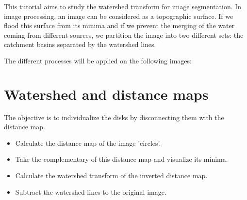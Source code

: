 \def\difficulty{3}

\begin{note}This tutorial aims to study the watershed transform for image segmentation. 
In image processing, an image can be considered as a topographic surface. If we flood this surface from its minima and if we prevent the merging of the water coming from different sources, we partition the image into two different sets: the catchment basins separated by the watershed lines. 
\end{note}

\noindent The different processes will be applied on the following images:

\begin{figure}[h]
\begin{center}
\hspace*{0.025cm}
\end{center}
\vspace*{-12pt}
\end{figure}

\vspace*{-10pt}


\section{Watershed and distance maps}
The objective is to individualize the disks by disconnecting them with the distance map.
\begin{qbox}
\begin{itemize}
	\item Calculate the distance map of the image 'circles'.
	\item Take the complementary of this distance map and visualize its minima.
	\item Calculate the watershed transform of the inverted distance map.
	\item Subtract the watershed lines to the original image. 
\end{itemize}
\end{qbox}

